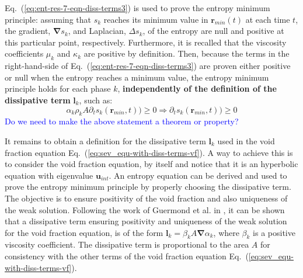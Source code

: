 \documentclass[preprint,10pt]{elsarticle}
\newcommand{\grad}{\mbold{\nabla}}
\newcommand{\mbold}[1]{\boldsymbol#1}
\newcommand{\eqt}[1]{Eq.~(\ref{#1})}                     %
\newcommand{\tcb}[1]{\textcolor{blue}{#1}}
\begin{document}
%
\eqt{eq:ent-res-7-eqn-diss-terms3} is used to prove the entropy minimum principle: assuming that $s_k$ reaches its minimum value in $\mbold r_{min}(t)$ at each time $t$, the gradient, $\grad s_k$, and Laplacian, $\Delta s_k$,  of the entropy are null and positive at this particular point, respectively. Furthermore, it is recalled that the viscosity coefficients $\mu_k$ and $\kappa_k$ are positive by definition. Then, because the terms in the right-hand-side of \eqt{eq:ent-res-7-eqn-diss-terms3} are proven either positive or null when the entropy reaches a minimum value, the entropy minimum principle holds for each phase $k$, \textbf{independently of the definition of the dissipative term} $\mbold l_k$, such as:
%
\begin{equation}\label{eq:ent-res-7-eqn-diss-terms4}
\alpha_k \rho_k A \partial_t s_k(\mbold r_{min},t)) \geq 0 \Rightarrow \partial_t s_k(\mbold r_{min},t)) \geq 0 \nonumber
\end{equation}
%
\tcb{Do we need to make the above statement a theorem or property?}

It remains to obtain a definition for the
dissipative term $\mbold l_k$ used in the void fraction equation \eqt{eq:sev_equ-with-diss-terms-vf}. A way to achieve this is to
consider the void fraction equation, by itself and notice that it is an hyperbolic equation
with eigenvalue $\mbold u_{int}$. An entropy equation can be derived and used to prove the
entropy minimum principle by properly choosing the dissipative term. The objective is to
ensure positivity of the void fraction and also uniqueness of the weak solution. Following
the work of Guermond et al. in \cite{jlg1, jlg2}, it can be shown that a dissipative term ensuring positivity and
uniqueness of the weak solution for the void fraction equation, is of the form $\mbold l_k = \beta_k A \grad \alpha_k $, where $\beta_k$
is a positive viscosity coefficient. The dissipative term is proportional to the area $A$ for consistency with the other terms of the void fraction equation \eqt{eq:sev_equ-with-diss-terms-vf}.
\end{document}
